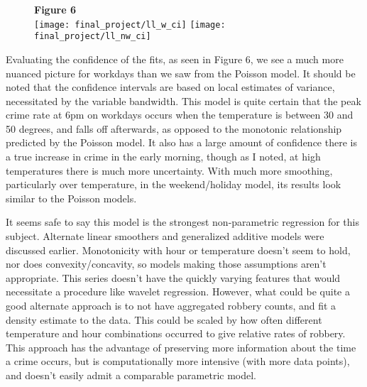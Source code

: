 \documentclass[11pt]{article}
\theoremstyle{definition}
\begin{document}
\begin{figure}[h]
    {\bf Figure 6} \\
    \texttt{[image: final\_project/ll\_w\_ci]}
    \texttt{[image: final\_project/ll\_nw\_ci]}
\end{figure}
Evaluating the confidence of the fits, as seen in Figure 6, we see a much more nuanced picture for workdays than we saw from the Poisson model. It should be noted that the confidence intervals are based on local estimates of variance, necessitated by the variable bandwidth. This model is quite certain that the peak crime rate at $6$pm on workdays occurs when the temperature is between 30 and 50 degrees, and falls off afterwards, as opposed to the monotonic relationship predicted by the Poisson model. It also has a large amount of confidence there is a true increase in crime in the early morning, though as I noted, at high temperatures there is much more uncertainty. With much more smoothing, particularly over temperature, in the weekend/holiday model, its results look similar to the Poisson models. \par
It seems safe to say this model is the strongest non-parametric regression for this subject. Alternate linear smoothers and generalized additive models were discussed earlier. Monotonicity with hour or temperature doesn't seem to hold, nor does convexity/concavity, so models making those assumptions aren't appropriate. This series doesn't have the quickly varying features that would necessitate a procedure like wavelet regression. However, what could be quite a good alternate approach is to not have aggregated robbery counts, and fit a density estimate to the data. This could be scaled by how often different temperature and hour combinations occurred to give relative rates of robbery. This approach has the advantage of preserving more information about the time a crime occurs, but is computationally more intensive (with more data points), and doesn't easily admit a comparable parametric model.
\end{document}
